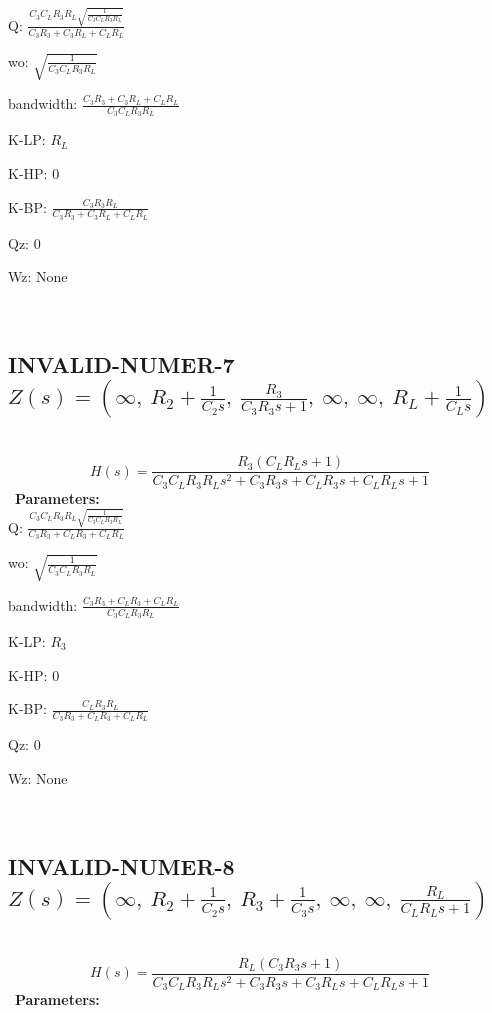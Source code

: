 \documentclass{article}
\begin{document}
Q: $\frac{C_{3} C_{L} R_{3} R_{L} \sqrt{\frac{1}{C_{3} C_{L} R_{3} R_{L}}}}{C_{3} R_{3} + C_{3} R_{L} + C_{L} R_{L}}$\ 

wo: $\sqrt{\frac{1}{C_{3} C_{L} R_{3} R_{L}}}$\ 

bandwidth: $\frac{C_{3} R_{3} + C_{3} R_{L} + C_{L} R_{L}}{C_{3} C_{L} R_{3} R_{L}}$\ 

K-LP: $R_{L}$\ 

K-HP: $0$\ 

K-BP: $\frac{C_{3} R_{3} R_{L}}{C_{3} R_{3} + C_{3} R_{L} + C_{L} R_{L}}$\ 

Qz: $0$\ 

Wz: $\text{None}$\ 

\ 

\subsection{INVALID-NUMER-7 $Z(s) = \left( \infty, \  R_{2} + \frac{1}{C_{2} s}, \  \frac{R_{3}}{C_{3} R_{3} s + 1}, \  \infty, \  \infty, \  R_{L} + \frac{1}{C_{L} s}\right)$ } \ 
\textbf{\[H(s) = \frac{R_{3} \left(C_{L} R_{L} s + 1\right)}{C_{3} C_{L} R_{3} R_{L} s^{2} + C_{3} R_{3} s + C_{L} R_{3} s + C_{L} R_{L} s + 1}\] } \ 
\textbf{Parameters:}\\ 

Q: $\frac{C_{3} C_{L} R_{3} R_{L} \sqrt{\frac{1}{C_{3} C_{L} R_{3} R_{L}}}}{C_{3} R_{3} + C_{L} R_{3} + C_{L} R_{L}}$\ 

wo: $\sqrt{\frac{1}{C_{3} C_{L} R_{3} R_{L}}}$\ 

bandwidth: $\frac{C_{3} R_{3} + C_{L} R_{3} + C_{L} R_{L}}{C_{3} C_{L} R_{3} R_{L}}$\ 

K-LP: $R_{3}$\ 

K-HP: $0$\ 

K-BP: $\frac{C_{L} R_{3} R_{L}}{C_{3} R_{3} + C_{L} R_{3} + C_{L} R_{L}}$\ 

Qz: $0$\ 

Wz: $\text{None}$\ 

\ 

\subsection{INVALID-NUMER-8 $Z(s) = \left( \infty, \  R_{2} + \frac{1}{C_{2} s}, \  R_{3} + \frac{1}{C_{3} s}, \  \infty, \  \infty, \  \frac{R_{L}}{C_{L} R_{L} s + 1}\right)$ } \ 
\textbf{\[H(s) = \frac{R_{L} \left(C_{3} R_{3} s + 1\right)}{C_{3} C_{L} R_{3} R_{L} s^{2} + C_{3} R_{3} s + C_{3} R_{L} s + C_{L} R_{L} s + 1}\] } \ 
\textbf{Parameters:}\\ 
\end{document}
